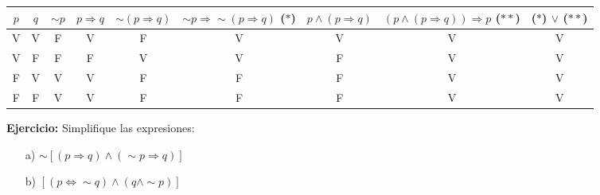\documentclass[a4paper,10pt]{article}
\begin{document}
\begin{enumerate}
        \begin{center}
        \begin{tabular}{|l|l|l|l|l|l|l|l|l|}
            \hline
            \multicolumn{1}{|c|}{$p$} & \multicolumn{1}{c|}{$q$} & \multicolumn{1}{c|}{$\sim p$}  & \multicolumn{1}{c|}{$p \Rightarrow q$} & \multicolumn{1}{c|}{$\sim(p \Rightarrow q)$} & \multicolumn{1}{c|}{$\sim p \Rightarrow \sim (p \Rightarrow q)$ ($\ast$)} & \multicolumn{1}{c|}{$p \wedge (p\Rightarrow q)$} & \multicolumn{1}{c|}{$\left(p \wedge (p \Rightarrow q)\right) \Rightarrow p$ ($\ast \ast$)}  & \multicolumn{1}{c|}{($\ast$) $\vee$ ($\ast \ast$)} \\
            \hline
            \multicolumn{1}{|c|}{V} & \multicolumn{1}{c|}{V} & \multicolumn{1}{c|}{F} & \multicolumn{1}{c|}{V} & \multicolumn{1}{c|}{F} & \multicolumn{1}{c|}{V} & \multicolumn{1}{c|}{V} & \multicolumn{1}{c|}{V} & \multicolumn{1}{c|}{V} \\
            \hline
            \multicolumn{1}{|c|}{V} & \multicolumn{1}{c|}{F} & \multicolumn{1}{c|}{F} & \multicolumn{1}{c|}{F} & \multicolumn{1}{c|}{V} & \multicolumn{1}{c|}{V} & \multicolumn{1}{c|}{F} & \multicolumn{1}{c|}{V} & \multicolumn{1}{c|}{V} \\
            \hline
            \multicolumn{1}{|c|}{F} & \multicolumn{1}{c|}{V} & \multicolumn{1}{c|}{V} & \multicolumn{1}{c|}{V} & \multicolumn{1}{c|}{F} & \multicolumn{1}{c|}{F} & \multicolumn{1}{c|}{F} & \multicolumn{1}{c|}{V} & \multicolumn{1}{c|}{V} \\
            \hline
            \multicolumn{1}{|c|}{F} & \multicolumn{1}{c|}{F} & \multicolumn{1}{c|}{V} & \multicolumn{1}{c|}{V} & \multicolumn{1}{c|}{F} & \multicolumn{1}{c|}{F} & \multicolumn{1}{c|}{F} & \multicolumn{1}{c|}{V} & \multicolumn{1}{c|}{V} \\
            \hline
        \end{tabular}
        \end{center}

    \end{enumerate}
    \vspace{5mm}







\textbf{Ejercicio:} Simplifique las expresiones:
        \begin{enumerate}
            \item[a)] $\displaystyle \sim \left[ (p \Rightarrow q) \wedge (\sim p \Rightarrow q) \right]$
            \item[b)] $\displaystyle \left[ (p \Leftrightarrow \sim q) \wedge (q \wedge \sim p) \right]$
        \end{enumerate}
\end{document}
